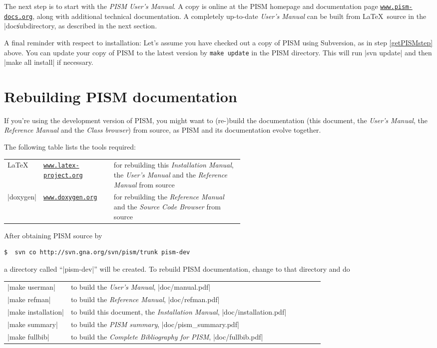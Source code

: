 \documentclass[11pt,final]{amsart}
\renewcommand{\t}[1]{\texttt{#1}}
\begin{document}
The next step is to start with the \emph{PISM User's Manual}.  A copy is online at the PISM homepage and documentation page \href{http://www.pism-docs.org/}{\t{www.pism-docs.org}}, along with additional technical documentation.  A completely up-to-date \emph{User's Manual} can be built from \LaTeX~source in the |doc\| subdirectory, as described in the next section.

A final reminder with respect to installation: Let's assume you have checked out a copy of PISM using Subversion, as in step \ref{getPISMstep} above.  You can update your copy of PISM to the latest version by \verb|make update| in the PISM directory.  This will run |svn update| and then |make all install| if necessary.


\newpage
\section{Rebuilding PISM documentation}
\label{sec:docs}

If you're using the development version of PISM, you might want to (re-)build the documentation (this document, the \emph{User's
  Manual}, the \emph{Reference Manual} and the \emph{Class browser}) from source, as PISM and its documentation evolve together.

The following table lists the tools required:
\begin{center}
  \begin{tabular*}{0.9\linewidth}{llp{0.55\linewidth}}
    \hline
    \LaTeX & \href{http://www.latex-project.org/}{\t{www.latex-project.org}} &  for rebuilding this \emph{Installation Manual}, the \emph{User's Manual} and the \emph{Reference Manual} from source\\
    |doxygen|\index{doxygen} & \href{http://www.stack.nl/~dimitri/doxygen/}{\t{www.doxygen.org}} &  for rebuilding the \emph{Reference Manual} and the \emph{Source Code Browser} from source  \\
    \hline
  \end{tabular*}
\end{center}

After obtaining PISM source by
\begin{verbatim}
$  svn co http://svn.gna.org/svn/pism/trunk pism-dev
\end{verbatim}
a directory called ``|pism-dev|'' will be created. To rebuild PISM documentation, change to that directory and do
\begin{center}
  \begin{tabular*}{0.9\linewidth}{lp{0.8\linewidth}}
    |make userman| & to build the \emph{User's Manual}, |doc/manual.pdf|\\
    |make refman| & to build the \emph{Reference Manual}, |doc/refman.pdf|\\
    |make installation| & to build this document, the \emph{Installation Manual}, |doc/installation.pdf|\\
    |make summary| & to build the \emph{PISM summary}, |doc/pism_summary.pdf|\\
    |make fullbib| & to build the \emph{Complete Bibliography for PISM}, |doc/fullbib.pdf|
  \end{tabular*}
\end{center}
\end{document}
